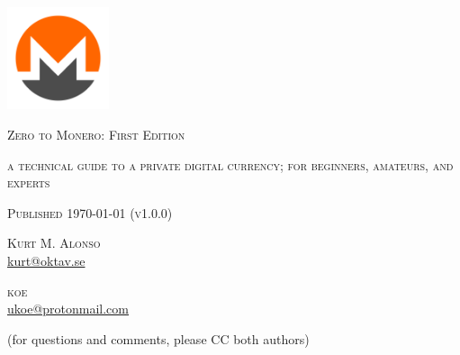 \documentclass[usletter,11pt,english,oneside,onecolumn,final,openany]{report}
\begin{document}
\setlength{\abovedisplayskip}{0pt}
\setlength{\belowdisplayskip}{0pt}
\setlength{\abovedisplayshortskip}{0pt}
\setlength{\belowdisplayshortskip}{0pt}


\pagestyle{plain}
\thispagestyle{empty}

\mbox{}
\vspace{1cm}

\begin{center}
  \includegraphics[width=3cm]{front/figures/monero-symbol-1280.png}
\end{center}


\vfill{}
{\par\centering \textsc{\huge Zero to Monero: First Edition}\par}
\smallskip
{\par\centering \textsc{\LARGE a technical guide to a private digital currency; for beginners, amateurs, and experts}\par}
\smallskip
{\par\centering \textsc{\LARGE Published \today{} (v1.0.0)}\par}
\bigskip
{\par\centering \textsc{\large Kurt M. Alonso} \\\underline{kurt@oktav.se}
\par \textsc{\large koe} \\\underline{ukoe@protonmail.com}\par \par
(for questions and comments, please CC both authors)\par}
\vfill{}
\end{document}
